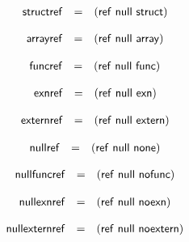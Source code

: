$$
\begin{array}[t]{@{}lcl@{}l@{}}
\mathsf{structref} & = & (\mathsf{ref}~\mathsf{null}~\mathsf{struct}) \\
\end{array}
$$

$$
\begin{array}[t]{@{}lcl@{}l@{}}
\mathsf{arrayref} & = & (\mathsf{ref}~\mathsf{null}~\mathsf{array}) \\
\end{array}
$$

$$
\begin{array}[t]{@{}lcl@{}l@{}}
\mathsf{funcref} & = & (\mathsf{ref}~\mathsf{null}~\mathsf{func}) \\
\end{array}
$$

$$
\begin{array}[t]{@{}lcl@{}l@{}}
\mathsf{exnref} & = & (\mathsf{ref}~\mathsf{null}~\mathsf{exn}) \\
\end{array}
$$

$$
\begin{array}[t]{@{}lcl@{}l@{}}
\mathsf{externref} & = & (\mathsf{ref}~\mathsf{null}~\mathsf{extern}) \\
\end{array}
$$

$$
\begin{array}[t]{@{}lcl@{}l@{}}
\mathsf{nullref} & = & (\mathsf{ref}~\mathsf{null}~\mathsf{none}) \\
\end{array}
$$

$$
\begin{array}[t]{@{}lcl@{}l@{}}
\mathsf{nullfuncref} & = & (\mathsf{ref}~\mathsf{null}~\mathsf{nofunc}) \\
\end{array}
$$

$$
\begin{array}[t]{@{}lcl@{}l@{}}
\mathsf{nullexnref} & = & (\mathsf{ref}~\mathsf{null}~\mathsf{noexn}) \\
\end{array}
$$

$$
\begin{array}[t]{@{}lcl@{}l@{}}
\mathsf{nullexternref} & = & (\mathsf{ref}~\mathsf{null}~\mathsf{noextern}) \\
\end{array}
$$

\vspace{1ex}

